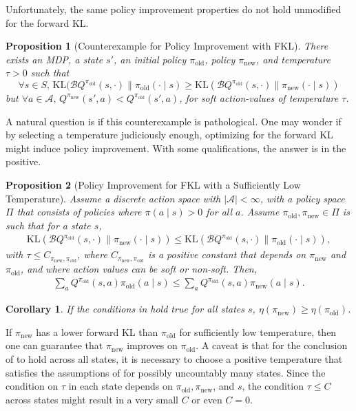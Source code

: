 \documentclass{article}
\newcommand{\actionspace}{\mathcal{A}}
\newcommand{\KL}{\mathrm{KL}}
\newcommand{\boltzmannQ}{\mathcal{B}Q}
\newcommand{\pinew}{{\pi_\mathrm{new}}}
\newcommand{\piold}{{\pi_\mathrm{old}}}
\newtheorem{proposition}{Proposition}
\newtheorem{corollary}{Corollary}
\begin{document}
Unfortunately, the same policy improvement properties do not hold unmodified for the forward KL. 
\begin{proposition}[Counterexample for Policy Improvement with FKL]\label{lem:forward-kl-counterexample}
There exists an MDP, a state $s'$, an initial policy $\piold$, policy $\pinew$, and temperature $\tau > 0$ such that
\begin{equation*}
    \forall s \in S,\, \KL(\boltzmannQ^\piold(s, \cdot) \parallel \piold(\cdot \mid s) \geq \KL(\boltzmannQ^\piold(s, \cdot) \parallel \pinew(\cdot \mid s))
    \end{equation*}
but $\forall a \in \actionspace, \, Q^\pinew(s', a) < Q^\piold(s', a)$, for soft action-values of temperature $\tau$. 
\end{proposition}
%
A natural question is if this counterexample is pathological. %
One may wonder if by selecting a temperature judiciously enough, optimizing for the forward KL might induce policy improvement. With some qualifications, the answer is in the positive. 
%
\begin{proposition}[Policy Improvement for FKL with a Sufficiently Low Temperature]\label{prop:forward-kl-surrogate-2}
Assume a discrete action space with $|\actionspace| < \infty$, with a policy space $\Pi$ that consists of policies where $\pi(a \mid s) > 0$ for all $a$. Assume $\piold, \pinew \in \Pi$ is such that for a state $s$,
\begin{align}\label{eq:forward-improvement}
    \KL(\boltzmannQ^{\piold}(s, \cdot) \parallel \pinew (\cdot \mid s)) \leq \KL(\boltzmannQ^{\piold}(s, \cdot) \parallel \piold(\cdot \mid s)),
\end{align}
with $\tau \leq C_{\pinew, \piold}$, where $C_{\pinew, \piold}$ is a positive constant that depends on $\pinew$ and $\piold$, and where action values can be soft or non-soft. Then,
\begin{align*}
    \sum_a Q^{\piold}(s, a) \piold(a \mid s) \leq \sum_a Q^{\piold}(s, a) \pinew(a \mid s). 
\end{align*}
\end{proposition}


\begin{corollary}
If the conditions in  hold true for all states $s$, $\eta(\pinew) \geq \eta(\piold)$. 
\end{corollary}
%
If $\pinew$ has a lower forward KL than $\piold$ for sufficiently low temperature, then one can guarantee that $\pinew$ improves on $\piold$. A caveat is that for the conclusion of  to hold across all states, it is necessary to choose a positive temperature that satisfies the assumptions of  for possibly uncountably many states. Since the condition on $\tau$ in each state depends on $\piold, \pinew$, and $s$, the condition $\tau \le C$ across states might result in a very small $C$ or even $C=0$.  
 
\end{document}
